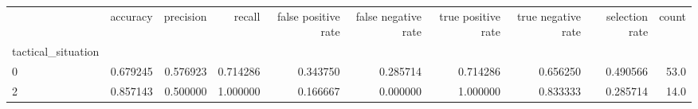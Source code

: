 \begin{tabular}{lrrrrrrrrr}
\toprule
{} &  accuracy &  precision &    recall &  false positive rate &  false negative rate &  true positive rate &  true negative rate &  selection rate &  count \\
tactical\_situation &           &            &           &                      &                      &                     &                     &                 &        \\
\midrule
0                  &  0.679245 &   0.576923 &  0.714286 &             0.343750 &             0.285714 &            0.714286 &            0.656250 &        0.490566 &   53.0 \\
2                  &  0.857143 &   0.500000 &  1.000000 &             0.166667 &             0.000000 &            1.000000 &            0.833333 &        0.285714 &   14.0 \\
\bottomrule
\end{tabular}

